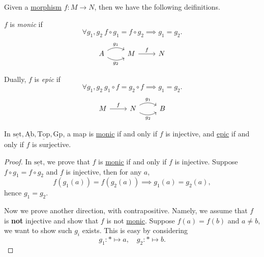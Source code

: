 \begin{definition*}
	Given a \hyperref[def:morphism]{morphism} \(f\colon M\to N\), then we have the following deifinitions.
	\begin{definition}[Monic]\label{def:monic}
		\(f\) is \emph{monic} if
		\[
			\forall g_1, g_2\ f\circ g_1 = f\circ g_2 \implies g_1 = g_2.
		\]
		\[
			\begin{tikzcd}
				A\ar[r, bend left, "g_1"]\ar[r, bend right, "g_2"']& M \ar[r, "f"]& N
			\end{tikzcd}
		\]
	\end{definition}

	\begin{definition}[Epic]\label{def:epic}
		Dually, \(f\) is \emph{epic} if
		\[
			\forall g_1, g_2\ g_{1} \circ f = g_2 \circ f \implies g_1 = g_2.
		\]
		\[
			\begin{tikzcd}
				M\ar[r, "f"]& N\ar[r, bend left, "g_1"]\ar[r, bend right, "g_2"']& B
			\end{tikzcd}
		\]
	\end{definition}
\end{definition*}

\begin{lemma}
	In \(\underline{\mathrm{set}}, \underline{\mathrm{Ab}}, \underline{\mathrm{Top}}, \underline{\mathrm{Gp}}\), a map is \hyperref[def:monic]{monic} if and only
	if \(f\) is injective, and \hyperref[def:epic]{epic} if and only if \(f\) is surjective.
\end{lemma}
\begin{proof}
	In \(\underline{\mathrm{set}}\), we prove that \(f\) is \hyperref[def:monic]{monic} if and only if \(f\) is injective. Suppose
	\(f\circ g_1 = f\circ g_2\) and \(f\) is injective, then for any \(a\),
	\[
		f(g_1(a)) = f(g_2(a))\implies g_1(a) = g_2(a),
	\]
	hence \(g_1 = g_2\).

	\par Now we prove another direction, with contrapositive. Namely, we assume that \(f\) is \textbf{not} injective and show that
	\(f\) is not \hyperref[def:monic]{monic}. Suppose \(f(a) = f(b)\) and \(a\neq b\), we want to show such \(g_{i}\) exists. This is easy by considering
	\[
		g_1\colon \ast\mapsto a,\quad g_2\colon \ast\mapsto b.
	\]
\end{proof}

